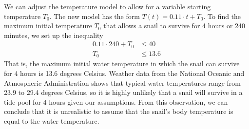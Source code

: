 \documentclass{article}
\begin{document}
   We can adjust the temperature model to allow for a variable starting temperature \(T_{0}\). The new model has the form \(T(t) = 0.11 \cdot t + T_{0}\).
   To find the maximum initial temperature \(T_{0}\) that allows a snail to survive for 4 hours or 240 minutes, we set up the inequality
   \begin{align*}
     0.11 \cdot 240 + T_{0} &\leq 40 \\
     T_{0} &\leq 13.6
   \end{align*}
   That is, the maximum initial water temperature in which the snail can survive for 4 hours is 13.6 degrees Celsius.
   Weather data from the National Oceanic and Atmospheric Administration shows that typical water temperatures range from 23.9 to 29.4 degrees Celsius,
   so it is highly unlikely that a snail will survive in a tide pool for 4 hours given our assumptions.
   From this observation, we can conclude that it is unrealistic to assume that the snail's body temperature is equal to the water temperature.
\end{document}
